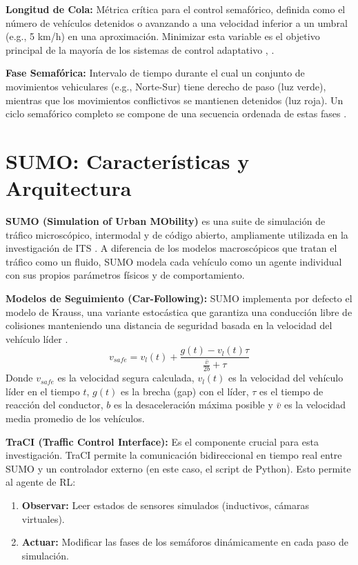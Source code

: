\documentclass[12pt, a4paper]{report}
\begin{document}
\textbf{Longitud de Cola:} Métrica crítica para el control semafórico, definida como el número de vehículos detenidos o avanzando a una velocidad inferior a un umbral (e.g., 5 km/h) en una aproximación. Minimizar esta variable es el objetivo principal de la mayoría de los sistemas de control adaptativo \cite{3}, \cite{6}.

\textbf{Fase Semafórica:} Intervalo de tiempo durante el cual un conjunto de movimientos vehiculares (e.g., Norte-Sur) tiene derecho de paso (luz verde), mientras que los movimientos conflictivos se mantienen detenidos (luz roja). Un ciclo semafórico completo se compone de una secuencia ordenada de estas fases \cite{5}.

\section{SUMO: Características y Arquitectura}
\textbf{SUMO (Simulation of Urban MObility)} es una suite de simulación de tráfico microscópico, intermodal y de código abierto, ampliamente utilizada en la investigación de ITS \cite{49}. A diferencia de los modelos macroscópicos que tratan el tráfico como un fluido, SUMO modela cada vehículo como un agente individual con sus propios parámetros físicos y de comportamiento.

\textbf{Modelos de Seguimiento (Car-Following):} SUMO implementa por defecto el modelo de Krauss, una variante estocástica que garantiza una conducción libre de colisiones manteniendo una distancia de seguridad basada en la velocidad del vehículo líder \cite{49}.
\begin{equation}
    v_{safe} = v_l(t) + \frac{g(t) - v_l(t) \tau}{ \frac{\bar{v}}{2b} + \tau }
\end{equation}
Donde $v_{safe}$ es la velocidad segura calculada, $v_l(t)$ es la velocidad del vehículo líder en el tiempo $t$, $g(t)$ es la brecha (gap) con el líder, $\tau$ es el tiempo de reacción del conductor, $b$ es la desaceleración máxima posible y $\bar{v}$ es la velocidad media promedio de los vehículos.

\textbf{TraCI (Traffic Control Interface):} Es el componente crucial para esta investigación. TraCI permite la comunicación bidireccional en tiempo real entre SUMO y un controlador externo (en este caso, el script de Python). Esto permite al agente de RL:
\begin{enumerate}
    \item \textbf{Observar:} Leer estados de sensores simulados (inductivos, cámaras virtuales).
    \item \textbf{Actuar:} Modificar las fases de los semáforos dinámicamente en cada paso de simulación.
\end{enumerate}
\end{document}
